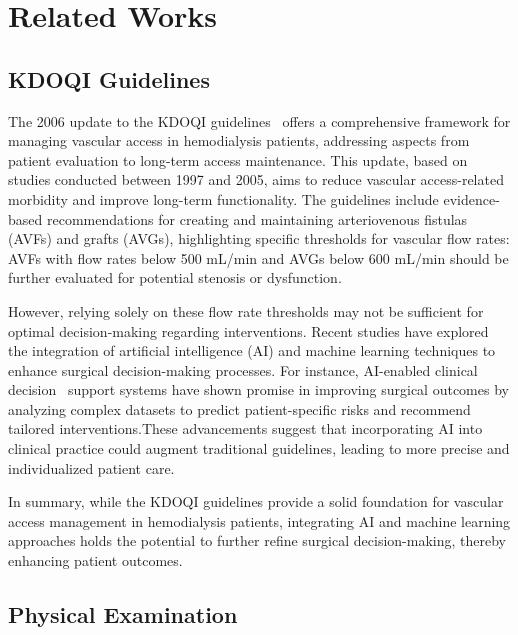 \chapter{Related Works}
\label{chapter:doccls}

\section{KDOQI Guidelines}

The 2006 update to the KDOQI guidelines~\cite{KDOQI} offers a comprehensive framework for managing vascular access in hemodialysis patients, addressing aspects from patient evaluation to long-term access maintenance. This update, based on studies conducted between 1997 and 2005, aims to reduce vascular access-related morbidity and improve long-term functionality. The guidelines include evidence-based recommendations for creating and maintaining arteriovenous fistulas (AVFs) and grafts (AVGs), highlighting specific thresholds for vascular flow rates: AVFs with flow rates below 500 mL/min and AVGs below 600 mL/min should be further evaluated for potential stenosis or dysfunction.

However, relying solely on these flow rate thresholds may not be sufficient for optimal decision-making regarding interventions. Recent studies have explored the integration of artificial intelligence (AI) and machine learning techniques to enhance surgical decision-making processes. For instance, AI-enabled clinical decision~\cite{Balch_2024} support systems have shown promise in improving surgical outcomes by analyzing complex datasets to predict patient-specific risks and recommend tailored interventions.These advancements suggest that incorporating AI into clinical practice could augment traditional guidelines, leading to more precise and individualized patient care.

In summary, while the KDOQI guidelines provide a solid foundation for vascular access management in hemodialysis patients, integrating AI and machine learning approaches holds the potential to further refine surgical decision-making, thereby enhancing patient outcomes.

\section{Physical Examination}

